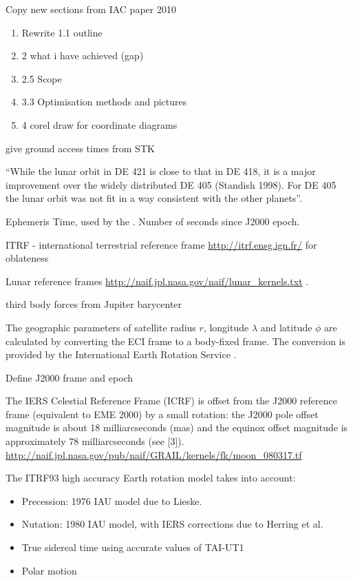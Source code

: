 
Copy new sections from IAC paper 2010 \textcite{Shimmin2010}

\begin{enumerate}
\item Rewrite 1.1 outline
\item 2 what i have achieved (gap)
\item 2.5 Scope
\item 3.3 Optimisation methods and pictures
\item 4 corel draw for coordinate diagrams
\end{enumerate}

give ground access times from STK

\enquote{While the lunar orbit in DE 421 is close to that in DE 418, it is a major improvement over the widely distributed DE 405 (Standish 1998). For DE 405 the lunar orbit was not fit in a way consistent with the other planets}\cite{DE421}.

Ephemeris Time, used by the \textcite{NAIF2010}. Number of seconds since J2000 epoch.


ITRF - international terrestrial reference frame \url{http://itrf.ensg.ign.fr/} for oblateness

Lunar reference frames \url{http://naif.jpl.nasa.gov/naif/lunar_kernels.txt} \textcite{LCF}.

third body forces from Jupiter barycenter

The geographic parameters of satellite radius $r$, longitude $\lambda$ and latitude $\phi$ are calculated by converting the ECI frame to a body-fixed frame. The conversion is provided by the International Earth Rotation Service \parencite{Petit2010}.

Define J2000 frame and epoch

The IERS Celestial Reference Frame (ICRF) is offset from the J2000 reference frame (equivalent to EME 2000) by a small rotation:  the J2000 pole offset magnitude is about 18 milliarcseconds (mas) and the equinox offset magnitude is approximately 78 milliarcseconds (see [3]). \url{http://naif.jpl.nasa.gov/pub/naif/GRAIL/kernels/fk/moon_080317.tf}

The ITRF93 high accuracy Earth rotation model takes into account:
\begin{itemize}
\item Precession: 1976 IAU model due to Lieske.
\item  Nutation: 1980 IAU model, with IERS corrections due to Herring et al.
\item  True sidereal time using accurate values of TAI-UT1
\item  Polar motion
\end{itemize}



